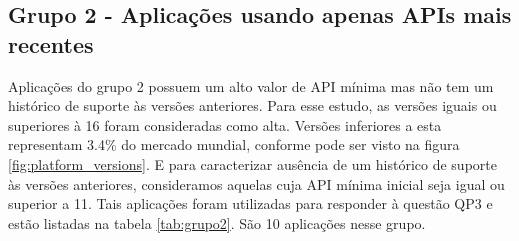 \subsection{Grupo 2 - Aplicações usando apenas APIs mais recentes}
Aplicações do grupo 2 possuem um alto valor de API mínima mas não tem um histórico de suporte
às versões anteriores. Para esse estudo, as versões iguais ou superiores à 16 foram consideradas
como alta. Versões inferiores a esta representam 3.4\% do mercado mundial, conforme pode ser visto
na figura \ref{fig:platform_versions}. E para caracterizar ausência de um histórico de suporte
às versões anteriores,
consideramos aquelas cuja API mínima inicial seja igual ou superior a 11. Tais aplicações foram
utilizadas para responder à questão QP3 e estão listadas na tabela \ref{tab:grupo2}. São 10
aplicações nesse grupo.

